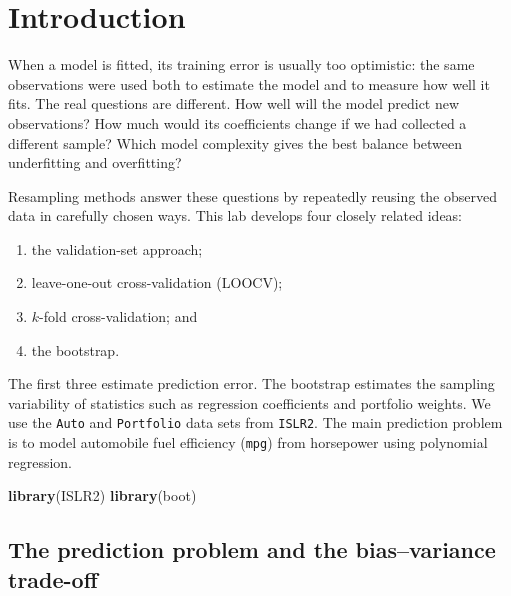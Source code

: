 \documentclass[
  11pt,
]{article}
\author{}
\date{\vspace{-2.5em}}
\newenvironment{Shaded}{\begin{snugshade}}{\end{snugshade}}
\newcommand{\FunctionTok}[1]{\textcolor[rgb]{0.13,0.29,0.53}{\textbf{#1}}}
\newcommand{\NormalTok}[1]{#1}
\providecommand{\tightlist}{%
  \setlength{\itemsep}{0pt}\setlength{\parskip}{0pt}}
\begin{document}

\section{Introduction}\label{introduction}

When a model is fitted, its training error is usually too optimistic:
the same observations were used both to estimate the model and to
measure how well it fits. The real questions are different. How well
will the model predict new observations? How much would its coefficients
change if we had collected a different sample? Which model complexity
gives the best balance between underfitting and overfitting?

Resampling methods answer these questions by repeatedly reusing the
observed data in carefully chosen ways. This lab develops four closely
related ideas:

\begin{enumerate}
\def\labelenumi{\arabic{enumi}.}
\tightlist
\item
  the validation-set approach;
\item
  leave-one-out cross-validation (LOOCV);
\item
  \(k\)-fold cross-validation; and
\item
  the bootstrap.
\end{enumerate}

The first three estimate prediction error. The bootstrap estimates the
sampling variability of statistics such as regression coefficients and
portfolio weights. We use the \texttt{Auto} and \texttt{Portfolio} data
sets from \texttt{ISLR2}. The main prediction problem is to model
automobile fuel efficiency (\texttt{mpg}) from horsepower using
polynomial regression.

\begin{Shaded}
\begin{Highlighting}[]
\FunctionTok{library}\NormalTok{(ISLR2)}
\FunctionTok{library}\NormalTok{(boot)}
\end{Highlighting}
\end{Shaded}

\subsection{The prediction problem and the bias--variance
trade-off}\label{the-prediction-problem-and-the-biasvariance-trade-off}
\end{document}
